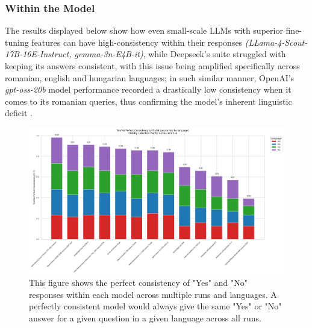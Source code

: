\documentclass[11pt]{article}
\begin{document}
\subsubsection{Within the Model} 
The results displayed below show how even small-scale LLMs with superior fine-tuning features can have high-consistency within their responses \textit{(LLama-4-Scout-17B-16E-Instruct, gemma-3n-E4B-it)}, while Deepseek's suite struggled with keeping its answers consistent, with this issue being amplified specifically across romanian, english and hungarian languages; in such similar manner, OpenAI's \textit{gpt-oss-20b} model performance recorded a drastically low consistency when it comes to its romanian queries, thus confirming the model's inherent linguistic deficit \cite{walker2024}.
\begin{figure}[htbp]
    \centering
    \includegraphics[scale=0.45]{../analysis_reports/A1_model_yesno_perfect_consistency.png}
    \caption{This figure shows the perfect consistency of "Yes" and "No" responses within each model across multiple runs and languages. A perfectly consistent model would always give the same "Yes" or "No" answer for a given question in a given language across all runs.}
    \label{fig:model_yesno_consistency}
\end{figure}

\end{document}
